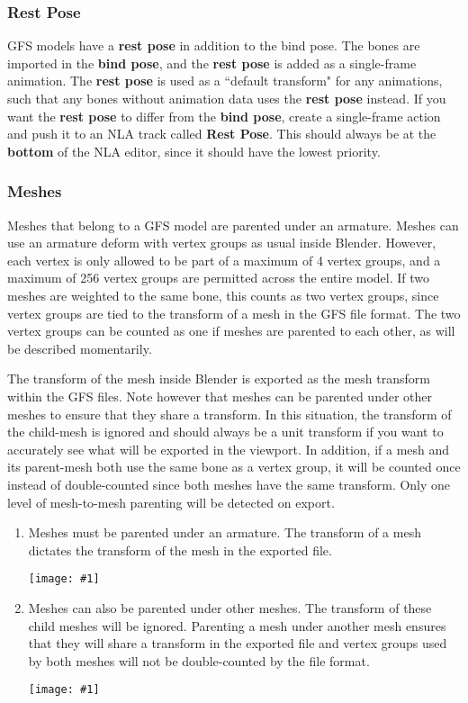 \documentclass{article}
\newenvironment{guide}[1]
{
	\begin{center}
		\begin{tcolorbox}[%
			colback=black!20, 
			boxrule=0pt, 
			title=Step-by-step: #1,
			enhanced,
			breakable,
			overlay unbroken={%
                \draw[line width=1pt, black, rounded corners]
        	    (frame.north west) rectangle (frame.south east);
			},
    		overlay first={%
        		 \draw[line width=1pt, black, rounded corners]
        	    (frame.south west) -- (frame.north west) -- (frame.north east) -- (frame.south east);
                \draw[line width=1pt, black]
                (frame.south west) -- (frame.south east);
            },
    		overlay middle={%
                \draw[line width=1pt, black]
        	    (frame.north west) rectangle (frame.south east);
        	},
    		overlay last={%
                \draw[line width=1pt, black, rounded corners]
        	    (frame.north west) -- (frame.south west) -- (frame.south east) -- (frame.north east);
                \draw[line width=1pt, black]
                (frame.north west) -- (frame.north east);
           	}
        ]{}
    	\begin{enumerate}
}
{
    		\end{enumerate}
    	\end{tcolorbox}
	\end{center}  	 
}
\newcommand{\guideimage}[1]
{
	\begin{center}
		\texttt{[image: \#1]}
	\end{center}
}
\begin{document}
\subsubsection{Rest Pose}
GFS models have a \textbf{rest pose} in addition to the bind pose. The bones are imported in the \textbf{bind pose}, and the \textbf{rest pose} is added as a single-frame animation. The \textbf{rest pose} is used as a ``default transform" for any animations, such that any bones without animation data uses the \textbf{rest pose} instead. If you want the \textbf{rest pose} to differ from the \textbf{bind pose}, create a single-frame action and push it to an NLA track called \textbf{Rest Pose}. This should always be at the \textbf{bottom} of the NLA editor, since it should have the lowest priority.

\subsubsection{Meshes}
Meshes that belong to a GFS model are parented under an armature. Meshes can use an armature deform with vertex groups as usual inside Blender. However, each vertex is only allowed to be part of a maximum of 4 vertex groups, and a maximum of 256 vertex groups are permitted across the entire model. If two meshes are weighted to the same bone, this counts as two vertex groups, since vertex groups are tied to the transform of a mesh in the GFS file format. The two vertex groups can be counted as one if meshes are parented to each other, as will be described momentarily.

The transform of the mesh inside Blender is exported as the mesh transform within the GFS files. Note however that meshes can be parented under other meshes to ensure that they share a transform. In this situation, the transform of the child-mesh is ignored and should always be a unit transform if you want to accurately see what will be exported in the viewport. In addition, if a mesh and its parent-mesh both use the same bone as a vertex group, it will be counted once instead of double-counted since both meshes have the same transform. Only one level of mesh-to-mesh parenting will be detected on export.

\begin{guide}{Mesh Parenting for GFS}
\item Meshes must be parented under an armature. The transform of a mesh dictates the transform of the mesh in the exported file.
\guideimage{images/editing_models/edits_parent_mesh.png}
\item Meshes can also be parented under other meshes. The transform of these child meshes will be ignored. Parenting a mesh under another mesh ensures that they will share a transform in the exported file and vertex groups used by both meshes will not be double-counted by the file format.
\guideimage{images/editing_models/edits_child_mesh.png}
\end{guide}
\end{document}
